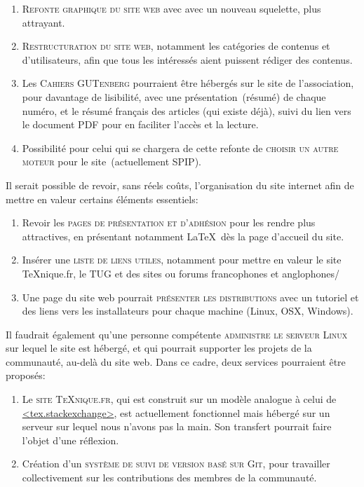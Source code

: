 \documentclass{tufte-handout}
\newcommand{\ratio}[3][]{\marginpar{\footnotesize{\textcolor{teal}{Temps requis: #2 / Utilité: #3}\par\noindent \textcolor{teal}{#1}}}}
\begin{document}
{\begin{enumerate}
	\item\textsc{Refonte graphique du site web} avec avec un nouveau squelette, plus attrayant.
	\item\textsc{Restructuration du site web}, notamment les catégories de contenus et d'utilisateurs, afin que tous les intéressés aient puissent rédiger des contenus.
	\item Les \textsc{Cahiers GUTenberg} pourraient être hébergés sur le site de l'association, pour davantage de lisibilité, avec une présentation~(résumé) de chaque numéro, et le résumé français des articles (qui existe déjà), suivi du lien vers le document PDF pour en faciliter l'accès et la lecture.
	\item Possibilité pour celui qui se chargera de cette refonte de \textsc{choisir un autre moteur} pour le site~(actuellement SPIP).
\end{enumerate}

Il serait possible de revoir, sans réels coûts\ratio[Travail limité dans le temps]{+}{+++}, l'organisation du site internet afin de mettre en valeur certains éléments essentiels:

\begin{enumerate}
	\item Revoir les \textsc{pages de présentation et d'adhésion} pour les rendre plus attractives, en présentant notamment \LaTeX\ dès la page d'accueil du site.
	\item Insérer une \textsc{liste de liens utiles}, notamment pour mettre en valeur le site \TeX nique.fr, le TUG et des sites ou forums francophones et anglophones/
	\item Une page du site web pourrait \textsc{présenter les distributions} avec un tutoriel et des liens vers les installateurs pour chaque machine (Linux, OSX, Windows).
\end{enumerate}

Il faudrait également qu'une personne compétente\ratio[Compétence très spécifique]{+}{+++} \textsc{administre le serveur Linux} sur lequel le site est hébergé, et qui pourrait supporter les projets de la communauté, au-delà du site web. Dans ce cadre, deux services pourraient être proposés:

\begin{enumerate}
	\item Le \textsc{site \TeX nique.fr}\ratio[Le site est déjà fonctionnel en l'état]{++}{+}, qui est construit sur un modèle analogue à celui de \url{<tex.stackexchange>}, est actuellement fonctionnel mais hébergé sur un serveur sur lequel nous n'avons pas la main. Son transfert pourrait faire l'objet d'une réflexion.
	\item Création d'un \textsc{système de suivi de version basé sur Git}\ratio[On peut créer un Github ou un FramaGit collectifs]{++}{+}, pour travailler collectivement sur les contributions des membres de la communauté.
\end{enumerate}


}
\end{document}
